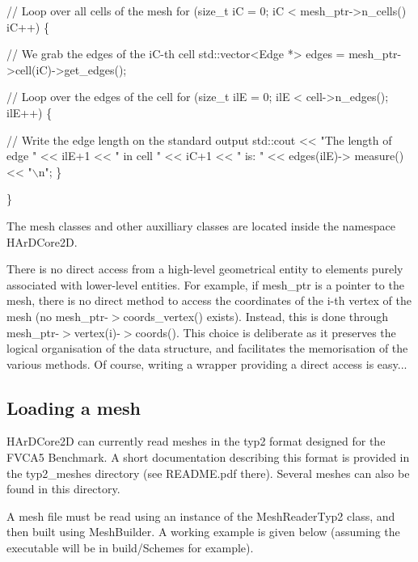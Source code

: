 \begin{DoxyCode}
\textcolor{comment}{// Loop over all cells of the mesh}
\textcolor{keywordflow}{for} (\textcolor{keywordtype}{size\_t} iC = 0; iC < mesh\_ptr->n\_cells() iC++) \{

    \textcolor{comment}{// We grab the edges of the iC-th cell}
    std::vector<Edge *> edges = mesh\_ptr->cell(iC)->get\_edges();

    \textcolor{comment}{// Loop over the edges of the cell}
    \textcolor{keywordflow}{for} (\textcolor{keywordtype}{size\_t} ilE = 0; ilE < cell->n\_edges(); ilE++) \{

        \textcolor{comment}{// Write the edge length on the standard output}
        std::cout << \textcolor{stringliteral}{"The length of edge "} << ilE+1 << \textcolor{stringliteral}{" in cell "} << iC+1 << \textcolor{stringliteral}{" is: "} << edges(ilE)->
      measure() << \textcolor{stringliteral}{"\(\backslash\)n"};
    \}

\}
\end{DoxyCode}


The mesh classes and other auxilliary classes are located inside the namespace H\+Ar\+D\+Core2D.

There is no direct access from a high-\/level geometrical entity to elements purely associated with lower-\/level entities. For example, if {\ttfamily mesh\+\_\+ptr} is a pointer to the mesh, there is no direct method to access the coordinates of the i-\/th vertex of the mesh (no {\ttfamily mesh\+\_\+ptr-\/$>$coords\+\_\+vertex()} exists). Instead, this is done through {\ttfamily mesh\+\_\+ptr-\/$>$vertex(i)-\/$>$coords()}. This choice is deliberate as it preserves the logical organisation of the data structure, and facilitates the memorisation of the various methods. Of course, writing a wrapper providing a direct access is easy...\hypertarget{index_loading_mesh}{}\subsection{Loading a mesh}\label{index_loading_mesh}
H\+Ar\+D\+Core2D can currently read meshes in the {\ttfamily typ2} format designed for the F\+V\+C\+A5 Benchmark. A short documentation describing this format is provided in the {\ttfamily typ2\+\_\+meshes} directory (see R\+E\+A\+D\+M\+E.\+pdf there). Several meshes can also be found in this directory.

A mesh file must be read using an instance of the {\ttfamily Mesh\+Reader\+Typ2} class, and then built using {\ttfamily Mesh\+Builder}. A working example is given below (assuming the executable will be in {\ttfamily build/\+Schemes} for example).


